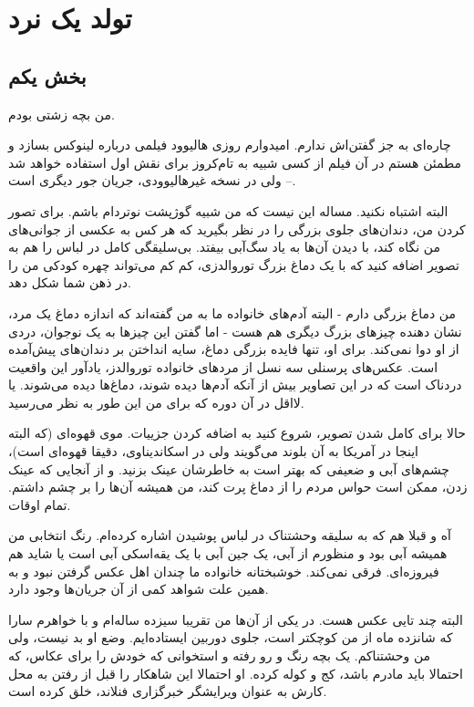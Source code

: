 \chapter{تولد یک نرد}
\section{بخش یکم}
من بچه زشتی بودم.

چاره‌ای به جز گفتن‌اش ندارم. امیدوارم روزی هالیوود فیلمی درباره لینوکس
بسازد و مطمئن هستم در آن فیلم از کسی شبیه به تام‌کروز برای نقش اول
استفاده خواهد شد – ولی در نسخه غیرهالیوودی، جریان جور دیگری است.

البته اشتباه نکنید. مساله این نیست که من شبیه گوژپشت نوتردام
باشم. برای تصور کردن من، دندان‌های جلوی بزرگی را در نظر بگیرید که هر کس
به عکسی از جوانی‌های من نگاه کند، با دیدن آن‌ها به یاد سگ‌آبی
بیفتد. بی‌سلیقگی کامل در لباس را هم به تصویر اضافه کنید که با یک دماغ
بزرگ توروالدزی، کم کم می‌تواند چهره کودکی من را در ذهن شما شکل دهد.

من دماغ بزرگی دارم - البته آدم‌های خانواده ما به من گفته‌اند که اندازه
دماغ یک مرد، نشان دهنده چیزهای بزرگ دیگری هم هست - اما گفتن این چیزها
به یک نوجوان، دردی از او دوا نمی‌کند. برای او، تنها فایده بزرگی دماغ،
سایه انداختن بر دندان‌های پیش‌آمده است. عکس‌های پرسنلی سه نسل از مردهای
خانواده توروالدز، یادآور این واقعیت دردناک است که در این تصاویر بیش از
آنکه آدم‌ها دیده شوند، دماغ‌ها دیده می‌شوند. یا لااقل در آن دوره که برای
من این طور به نظر می‌رسید.

حالا برای کامل شدن‌ تصویر، شروع کنید به اضافه کردن جزییات. موی قهوه‌ای
(که البته اینجا در آمریکا به آن بلوند می‌گویند ولی در اسکاندیناوی،
دقیقا قهوه‌ای است)، چشم‌های آبی و ضعیفی که بهتر است به خاطرشان عینک
بزنید. و از آنجایی که عینک زدن، ممکن است حواس مردم را از دماغ پرت کند،
من همیشه آن‌ها را بر چشم داشتم. تمام اوقات.

آه و قبلا هم که به سلیقه وحشتناک در لباس پوشیدن اشاره کرده‌ام. رنگ
انتخابی من همیشه آبی بود و منظورم از آبی، یک جین آبی با یک یقه‌اسکی آبی
است یا شاید هم فیروزه‌ای. فرقی نمی‌کند. خوشبختانه خانواده ما چندان اهل
عکس گرفتن نبود و به همین علت شواهد کمی از آن جریان‌ها وجود دارد.

البته چند تایی عکس هست. در یکی از آن‌ها من تقریبا سیزده ساله‌ام و با
خواهرم سارا که شانزده ماه از من کوچکتر است، جلوی دوربین
ایستاده‌ایم. وضع او بد نیست، ولی من وحشتناکم. یک بچه رنگ و رو رفته و
استخوانی که خودش را برای عکاس، که احتمالا باید مادرم باشد، کج و کوله
کرده. او احتمالا این شاهکار را قبل از رفتن به محل کارش به عنوان
ویرایشگر خبرگزاری فنلاند، خلق کرده است.

